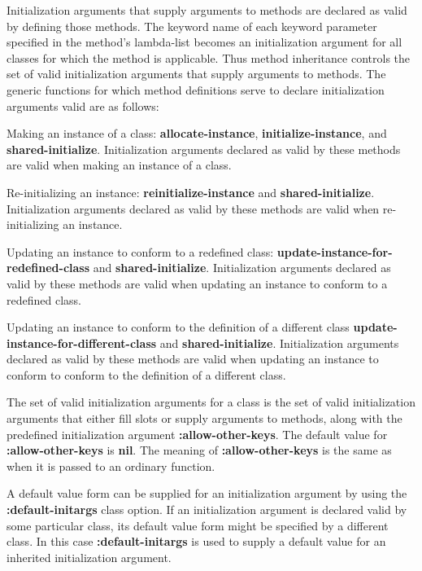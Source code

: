 \item{\bull} Initialization arguments that supply arguments to methods
are declared as valid by defining those methods.  The keyword name of
each keyword parameter specified in the method's lambda-list becomes
an initialization argument for all classes for which the method is
applicable.  Thus method inheritance controls the set of valid
initialization arguments that supply arguments to methods.  The
generic functions for which method definitions serve to declare
initialization arguments valid are as follows:

\itemitem{--} Making an instance of a class: {\bf allocate-instance},
{\bf initialize-instance}, and {\bf shared-initialize}.
Initialization arguments declared as valid by these methods are
valid when making an instance of a class.

\itemitem{--} Re-initializing an instance: {\bf reinitialize-instance}
and {\bf shared-initialize}.
Initialization arguments declared as valid by these methods are
valid when re-initializing an instance.

\itemitem{--}  Updating an instance to conform to a redefined class:
{\bf update-instance-for-redefined-class} and {\bf shared-initialize}.
Initialization arguments declared as valid by these methods are
valid when updating an instance to conform to a redefined class.

\itemitem{--} Updating an instance to conform to the definition of a
different class {\bf update-instance-for-different-class} and {\bf
shared-initialize}.
Initialization arguments declared as valid by these methods are
valid when updating an instance to conform to conform to the definition
of a different class.

\endlist

The set of valid initialization arguments for a class is the set of
valid initialization arguments that either fill slots or supply
arguments to methods, along with the predefined initialization
argument {\bf :allow-other-keys}.  The default value for {\bf
:allow-other-keys} is {\bf nil}.  The meaning of {\bf
:allow-other-keys} is the same as when it is passed to an ordinary
function.

\endsubSection%


A {\bit default value form\/} can be supplied for an initialization
argument by using the {\bf :default-initargs} class option.  If an
initialization argument is declared valid by some particular class,
its default  value form might be specified by a different class. 
In this case {\bf :default-initargs} is used to supply a default value
for an inherited initialization argument.

